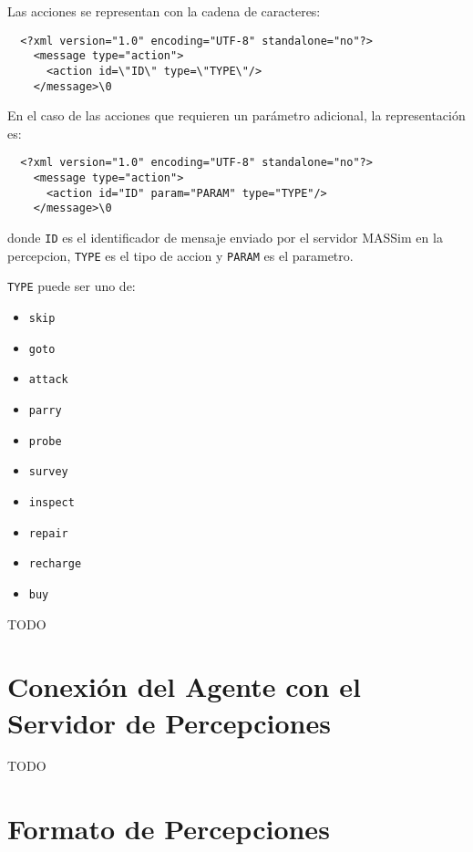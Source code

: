   Las acciones se representan con la cadena de caracteres:
  
  \begin{verbatim}
  <?xml version="1.0" encoding="UTF-8" standalone="no"?>
    <message type="action">
      <action id=\"ID\" type=\"TYPE\"/>
    </message>\0
  \end{verbatim}
  
  En el caso de las acciones que requieren un parámetro adicional, la
  representación es:
  
  \begin{verbatim}
  <?xml version="1.0" encoding="UTF-8" standalone="no"?>
    <message type="action">
      <action id="ID" param="PARAM" type="TYPE"/>
    </message>\0
  \end{verbatim}
  
  donde {\tt ID} es el identificador de mensaje enviado por el servidor
  MASSim en la percepcion, {\tt TYPE} es el tipo de accion y {\tt PARAM}
  es el parametro. 
  
  {\tt TYPE} puede ser uno de:
  
  \begin{itemize}
  \item \tt{skip}
  \item \tt{goto}
  \item \tt{attack}
  \item \tt{parry}
  \item \tt{probe}
  \item \tt{survey}
  \item \tt{inspect}
  \item \tt{repair}
  \item \tt{recharge}
  \item \tt{buy}
  \end{itemize}
\label{subsub:acciones}

 TODO

\section{Conexión del Agente con el Servidor de Percepciones}
\label{sec:conexion}

 TODO

\section{Formato de Percepciones}
\label{sec:formato_percepciones}

